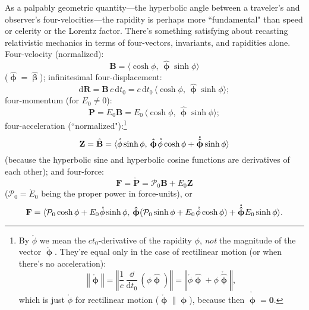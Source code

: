 \documentclass[12pt]{article}
\renewcommand{\vv}[1]{\mathbf{#1}}
\newcommand{\dd}[1]{\mathrm{d}#1}
\newcommand{\hatbeta}{\bm{\hat{\upbeta}}}
\newcommand{\vvphi}{\bm{\upphi}}
\newcommand{\hatphi}{\bm{\hat{\upphi}}}
\begin{document}
As a palpably geometric quantity---the hyperbolic angle between a traveler's and observer's four-velocities---the rapidity is perhaps more ``fundamental" than speed or celerity or the Lorentz factor. There's something satisfying about recasting relativistic mechanics in terms of four-vectors, invariants, and rapidities alone. Four-velocity (normalized):
\begin{equation*}
\vv B = \langle \cosh{\phi}, \, \hatphi \sinh{\phi} \rangle
\end{equation*}
($\hatphi = \hatbeta$); infinitesimal four-displacement:
\begin{equation*}
\dd \vv R = \vv B \, c \, \dd t_0 = c \, \dd t_0 \, \langle \cosh{\phi}, \, \hatphi \sinh{\phi} \rangle ;
\end{equation*}
four-momentum (for $E_0 \neq 0$):
\begin{equation*}
\vv P = E_0 \vv B = E_0 \, \langle \cosh{\phi}, \, \hatphi \sinh{\phi} \rangle ;
\end{equation*}
four-acceleration (``normalized"):\footnote{\label{fn:ph}By $\mathring{\phi}$ we mean the $ct_0$-derivative of the rapidity $\phi$, \emph{not} the magnitude of the vector $\mathring{\vvphi}$. They're equal only in the case of rectilinear motion (or when there's no acceleration):
\begin{equation*}
\left \Vert \mathring{\vvphi} \right \Vert = \left \Vert \dfrac{1}{c} \, \dfrac{\dd}{\dd t_0} \, ( \phi \hatphi ) \right \Vert = \left \Vert \mathring{\phi} \hatphi + \phi \mathring{\hatphi} \right \Vert,
\end{equation*}
which is just $\mathring{\phi}$ for rectilinear motion ($\mathring{\vvphi} \parallel \vvphi$), because then $\mathring{\hatphi} = \vv 0$.}
\begin{equation*}
\vv Z = \mathring{\vv B} = \langle  \mathring{\phi} \sinh{\phi} , \, \hatphi \mkern1.5mu \mathring{\phi} \cosh{\phi} + \mathring{\hatphi} \sinh{\phi} \rangle
\end{equation*}
(because the hyperbolic sine and hyperbolic cosine functions are derivatives of each other); and four-force:
\begin{equation*}
\vv F = \mathring{\vv P} = \mathcal{P}_0 \vv B + E_0 \vv Z
\end{equation*}
($\mathcal{P}_0 = \mathring{E}_0$ being the proper power in force-units), or
\begin{equation*}
\vv F = \langle \mathcal{P}_0 \cosh{\phi} + E_0 \mkern1.5mu \mathring{\phi} \sinh{\phi} , \, \hatphi ( \mathcal{P}_0 \sinh{\phi} + E_0 \mkern1.5mu \mathring{\phi} \cosh{\phi} ) + \mathring{\hatphi} E_0 \sinh{\phi} \rangle .
\end{equation*}
\end{document}
